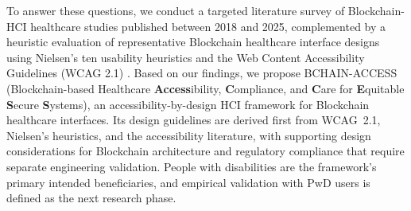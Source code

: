 \documentclass[journal,onecolumn]{IEEEtran}
\begin{document}
To answer these questions, we conduct a targeted literature survey of Blockchain-HCI healthcare studies published between 2018 and 2025, complemented by a heuristic evaluation of representative Blockchain healthcare interface designs using Nielsen's ten usability heuristics \cite{nielsen1994usability} and the Web Content Accessibility Guidelines (WCAG 2.1) \cite{wcag21}. Based on our findings, we propose BCHAIN-ACCESS (Blockchain-based Healthcare \textbf{Access}ibility, \textbf{C}ompliance, and \textbf{C}are for \textbf{E}quitable \textbf{S}ecure \textbf{S}ystems), an accessibility-by-design HCI framework for Blockchain healthcare interfaces. Its design guidelines are derived first from WCAG~2.1, Nielsen's heuristics, and the accessibility literature, with supporting design considerations for Blockchain architecture and regulatory compliance that require separate engineering validation. People with disabilities are the framework's primary intended beneficiaries, and empirical validation with PwD users is defined as the next research phase.
\end{document}

